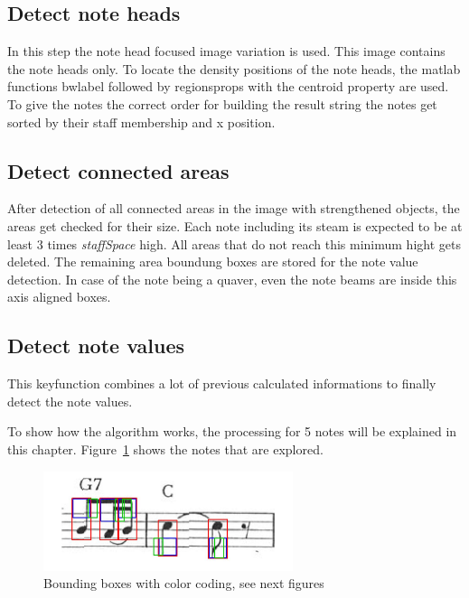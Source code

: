 \subsection{Detect note heads}
In this step the note head focused image variation is used. This image contains the note heads only. To locate the density positions of the note heads, the matlab functions bwlabel followed by regionsprops with the centroid property are used. To give the notes the correct order for building the result string the notes get sorted by their staff membership and x position. 


\subsection{Detect connected areas}
After detection of all connected areas in the image with strengthened objects, the areas get checked for their size. Each note including its steam is expected to be at least 3 times \textit{staffSpace} high. All areas that do not reach this minimum hight gets deleted. The remaining area boundung boxes are stored for the note value detection. In case of the note being a quaver, even the note beams are inside this axis aligned boxes.



\subsection{Detect note values}
This keyfunction combines a lot of previous calculated informations to finally detect the note values. 

To show how the algorithm works, the processing for 5 notes will be explained in this chapter. Figure~\ref{fig:boundingBoxes} shows the notes that are explored.

\begin{figure}[Htbp]
    \centering
		\includegraphics[width=0.65\textwidth]{boundingBoxes.jpg}
		\caption{Bounding boxes with color coding, see next figures \label{fig:boundingBoxes}}
\end{figure}



